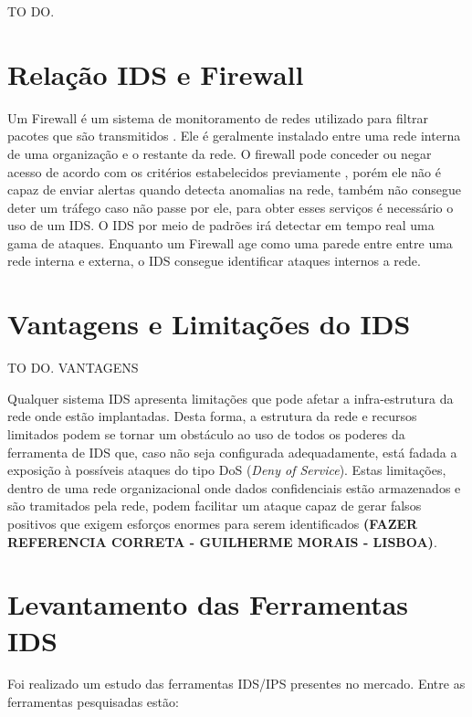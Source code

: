 		TO DO.

	\section{Relação IDS e Firewall}
	\label{sec:IDS_Firewall}

	Um Firewall é um sistema de monitoramento de redes utilizado para filtrar pacotes que são transmitidos . Ele é geralmente instalado entre uma rede interna de uma organização e o restante da rede. O firewall pode conceder ou negar acesso de acordo com os critérios estabelecidos previamente \cite{Morais}, porém ele não é capaz de enviar alertas quando detecta anomalias na rede, também não consegue deter um tráfego caso não passe por ele, para obter esses serviços é necessário o uso de um IDS. O IDS por meio de padrões irá detectar em tempo real uma gama de ataques. Enquanto um Firewall age como uma parede entre entre uma rede interna e externa, o IDS consegue identificar ataques internos a rede.

	\section{Vantagens e Limitações do IDS}
	\label{sec:IDS_VeL}

		TO DO. VANTAGENS
		
	Qualquer sistema IDS apresenta limitações que pode afetar a infra-estrutura da rede onde estão implantadas. Desta forma, a estrutura da rede e recursos limitados podem se tornar um obstáculo ao uso de todos os poderes da ferramenta de IDS que, caso não seja configurada adequadamente, está fadada a exposição à possíveis ataques do tipo DoS (\textit{Deny of Service}). Estas limitações, dentro de uma rede organizacional onde dados confidenciais estão armazenados e são tramitados pela rede, podem facilitar um ataque capaz de gerar falsos positivos que exigem esforços enormes para serem identificados \textbf{(FAZER REFERENCIA CORRETA - GUILHERME MORAIS - LISBOA)}.

	\section{Levantamento das Ferramentas IDS}
	\label{sec:IDS_Ferramentas}
	

		Foi realizado um estudo das ferramentas IDS/IPS presentes no mercado. Entre as ferramentas pesquisadas estão:

